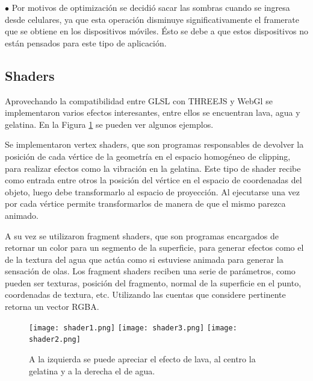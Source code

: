 \documentclass[12pt]{article}
\begin{document}
$\bullet$ Por motivos de optimización se decidió sacar las sombras cuando se ingresa desde celulares, ya que esta operación disminuye significativamente el framerate que se obtiene en los dispositivos móviles. Ésto se debe a que estos dispositivos no están pensados para este tipo de aplicación.

\clearpage
\subsection{Shaders}
Aprovechando la compatibilidad entre GLSL con THREEJS y WebGl se implementaron varios efectos interesantes, entre ellos se encuentran lava, agua y gelatina. En la Figura \ref{shader} se pueden ver algunos ejemplos.

Se implementaron vertex shaders, que son programas responsables de devolver la posición de cada vértice de la geometría en el espacio homogéneo de clipping, para realizar efectos como la vibración en la gelatina. Este tipo de shader recibe como entrada entre otros la posición del vértice en el espacio de coordenadas del objeto, luego debe transformarlo al espacio de proyección. Al ejecutarse una vez por cada vértice permite transformarlos de manera de que el mismo parezca animado.

A su vez se utilizaron fragment shaders, que son programas encargados de retornar un color para un segmento de la superficie, para generar efectos como el de la textura del agua que actúa como si estuviese animada para generar la sensación de olas. Los fragment shaders reciben una serie de parámetros, como pueden ser texturas, posición del fragmento, normal de la superficie en el punto, coordenadas de textura, etc. Utilizando las cuentas que considere pertinente retorna un vector RGBA.

\begin{figure}[h!]
\texttt{[image: shader1.png]}
\hfill
\texttt{[image: shader3.png]}
\hfill
\texttt{[image: shader2.png]}
\caption{ A la izquierda se puede apreciar el efecto de lava, al centro la gelatina y a la derecha el de agua.}
\label{shader}
\end{figure}
\end{document}
